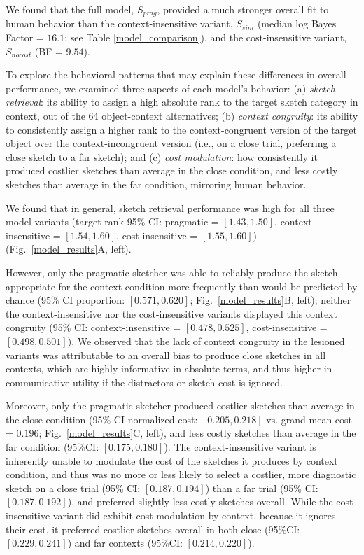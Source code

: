 \documentclass[9pt,twocolumn,twoside]{pnas-new}
\begin{document}
We found that the full model, $S_{prag}$, provided a much stronger overall fit to human behavior than the context-insensitive variant, $S_{sim}$ (median log Bayes Factor = $16.1$; see Table \ref{model_comparison}), and the cost-insensitive variant, $S_{nocost}$ (BF = $9.54$).

To explore the behavioral patterns that may explain these differences in overall performance, we examined three aspects of each model's behavior: (a) \textit{sketch retrieval}: its ability to assign a high absolute rank to the target sketch category in context, out of the 64 object-context alternatives; (b) \textit{context congruity}: its ability to consistently assign a higher rank to the context-congruent version of the target object over the context-incongruent version (i.e., on a close trial, preferring a close sketch to a far sketch); and (c) \textit{cost modulation}: how consistently it produced costlier sketches than average in the close condition, and less costly sketches than average in the far condition, mirroring human behavior.

We found that in general, sketch retrieval performance was high for all three model variants (target rank 95\% CI: pragmatic = $[1.43, 1.50]$, context-insensitive = $[1.54, 1.60]$, cost-insensitive = $[1.55, 1.60]$) (Fig.~\ref{model_results}A, left).

However, only the pragmatic sketcher was able to reliably produce the sketch appropriate for the context condition more frequently than would be predicted by chance (95\% CI proportion: $[0.571, 0.620]$; Fig.~\ref{model_results}B, left); neither the context-insensitive nor the cost-insensitive variants displayed this context congruity (95\% CI: context-insensitive = $[0.478, 0.525]$, cost-insensitive = $[0.498, 0.501]$). 
We observed that the lack of context congruity in the lesioned variants was attributable to an overall bias to produce close sketches in all contexts, which are highly informative in absolute terms, and thus higher in communicative utility if the distractors or sketch cost is ignored. 

Moreover, only the pragmatic sketcher produced costlier sketches than average in the close condition (95\% CI normalized cost: $[0.205, 0.218]$ vs. grand mean cost = $0.196$; Fig.~\ref{model_results}C, left), and less costly sketches than average in the far condition (95\%CI: $[0.175, 0.180]$). 
The context-insensitive variant is inherently unable to modulate the cost of the sketches it produces by context condition, and thus was no more or less likely to select a costlier, more diagnostic sketch on a close trial (95\% CI: $[0.187, 0.194]$) than a far trial (95\% CI: $[0.187, 0.192]$), and preferred slightly less costly sketches overall. 
While the cost-insensitive variant did exhibit cost modulation by context, because it ignores their cost, it preferred costlier sketches overall in both close (95\%CI: $[0.229, 0.241]$) and far contexts (95\%CI: $[0.214, 0.220]$). 
\end{document}
